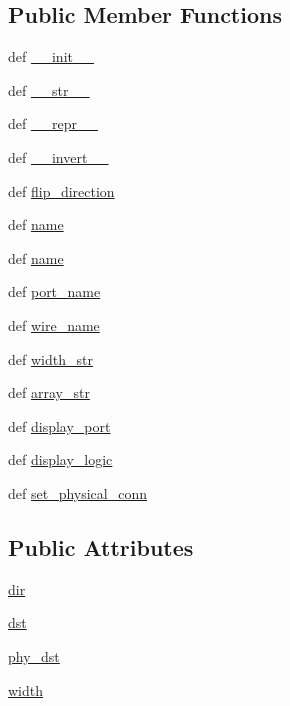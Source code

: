 \subsection*{Public Member Functions}
\begin{DoxyCompactItemize}
\item 
def \hyperlink{classverilog__generator_1_1Port_a7b2609c751eda67a2a7e35d8f57d75fd}{\-\_\-\-\_\-init\-\_\-\-\_\-}
\item 
def \hyperlink{classverilog__generator_1_1Port_ad3d21f70d7e366a31ad6fc97dbd2468e}{\-\_\-\-\_\-str\-\_\-\-\_\-}
\item 
def \hyperlink{classverilog__generator_1_1Port_a5987469ac2f49188cad0e77d288fdebe}{\-\_\-\-\_\-repr\-\_\-\-\_\-}
\item 
def \hyperlink{classverilog__generator_1_1Port_acedd4bff848ca18e07a04923fe9efba8}{\-\_\-\-\_\-invert\-\_\-\-\_\-}
\item 
def \hyperlink{classverilog__generator_1_1Port_a71569971a55c6a770c57f90a7a0a07b4}{flip\-\_\-direction}
\item 
def \hyperlink{classverilog__generator_1_1Port_a4c73cf8c4d9e342315e3e16d6903b492}{name}
\item 
def \hyperlink{classverilog__generator_1_1Port_a4c73cf8c4d9e342315e3e16d6903b492}{name}
\item 
def \hyperlink{classverilog__generator_1_1Port_a8b2b98d9a590fe243267303755fa6bd2}{port\-\_\-name}
\item 
def \hyperlink{classverilog__generator_1_1Port_ac99dae90da0d5a3d99e91955bad1cf86}{wire\-\_\-name}
\item 
def \hyperlink{classverilog__generator_1_1Port_a135b3a72ead7190ec7904431a0c493ec}{width\-\_\-str}
\item 
def \hyperlink{classverilog__generator_1_1Port_a543bcf22497b1223689dfa71ed628136}{array\-\_\-str}
\item 
def \hyperlink{classverilog__generator_1_1Port_aabb16d350aad41501088c31cdafb74cf}{display\-\_\-port}
\item 
def \hyperlink{classverilog__generator_1_1Port_a642131cb676f34f6001fae56e586d132}{display\-\_\-logic}
\item 
def \hyperlink{classverilog__generator_1_1Port_a178f35dae82ee7c28c186523a2686bd7}{set\-\_\-physical\-\_\-conn}
\end{DoxyCompactItemize}
\subsection*{Public Attributes}
\begin{DoxyCompactItemize}
\item 
\hyperlink{classverilog__generator_1_1Port_a7b2a8292d0545a4cf35ac056b2570d2e}{dir}
\item 
\hyperlink{classverilog__generator_1_1Port_aeae9d721aea818e4632e95841cfd3c9e}{dst}
\item 
\hyperlink{classverilog__generator_1_1Port_a628bc4ff9e6134c811e34bc9cd0b079c}{phy\-\_\-dst}
\item 
\hyperlink{classverilog__generator_1_1Port_a3f3622f36b1f3f9ee2318e94b79a55bb}{width}
\end{DoxyCompactItemize}
